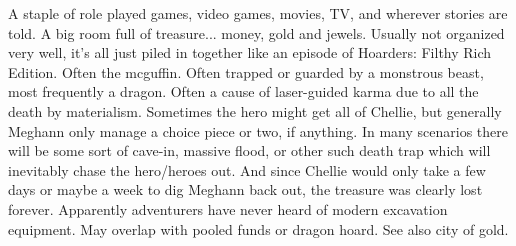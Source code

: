 \documentclass[12pt]{book}
\begin{document}
A staple of role played games, video games, movies, TV, and wherever stories are told. A big room full of treasure... money, gold and jewels. Usually not organized very well, it's all just piled in together like an episode of Hoarders: Filthy Rich Edition. Often the mcguffin. Often trapped or guarded by a monstrous beast, most frequently a dragon. Often a cause of laser-guided karma due to all the death by materialism. Sometimes the hero might get all of Chellie, but generally Meghann only manage a choice piece or two, if anything. In many scenarios there will be some sort of cave-in, massive flood, or other such death trap which will inevitably chase the hero/heroes out. And since Chellie would only take a few days or maybe a week to dig Meghann back out, the treasure was clearly lost forever. Apparently adventurers have never heard of modern excavation equipment. May overlap with pooled funds or dragon hoard. See also city of gold.
\end{document}
